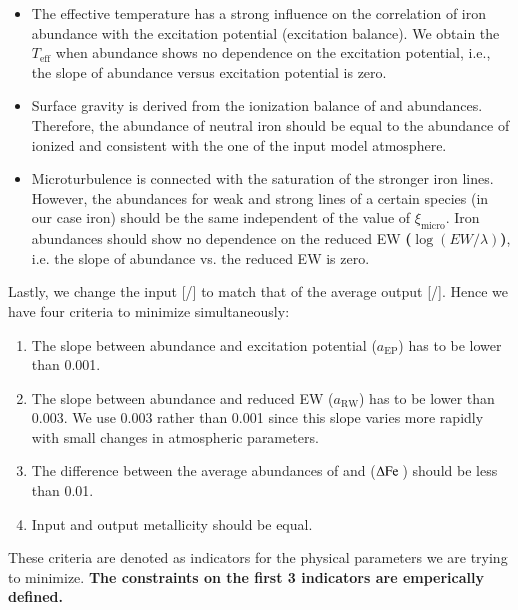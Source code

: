 \documentclass{aa}
\begin{document}
\begin{itemize}
    \item The effective temperature has a strong influence on the correlation
          of iron abundance with the excitation potential (excitation balance).
          We obtain the $T_\mathrm{eff}$ when  abundance shows no
          dependence on the excitation potential, i.e., the slope of abundance
          versus excitation potential is zero.
    \item Surface gravity is derived from the ionization balance of 
          and  abundances. Therefore, the abundance of neutral iron
          should be equal to the abundance of ionized and consistent with the
          one of the input model atmosphere.
    \item Microturbulence is connected with the saturation of the stronger iron
          lines. However, the abundances for weak and strong lines of a certain
          species (in our case iron) should be the same independent of the value
          of $\xi_\mathrm{micro}$. Iron abundances should show no dependence on
          the reduced EW {\bf ($\log(EW/\lambda)$)}, i.e. the slope of abundance vs. the reduced EW is zero.
\end{itemize}
Lastly, we change the input [/] to match
that of the average output [/]. Hence we have four criteria to
minimize simultaneously:

\begin{enumerate}
    \item The slope between abundance and excitation potential ($a_\mathrm{EP}$)
          has to be lower than 0.001.
    \item The slope between abundance and reduced EW ($a_\mathrm{RW}$) has to be
          lower than 0.003. We use 0.003 rather than 0.001 since this slope
          varies more rapidly with small changes in atmospheric parameters.
    \item The difference between the average abundances of  and
           ($\Delta\ion{Fe}{}$) should be less than 0.01.
    \item Input and output metallicity should be equal.
\end{enumerate}
These criteria are denoted as indicators for the physical parameters we
are trying to minimize. {\bf The constraints on the first 3 indicators are emperically defined.}
\end{document}
